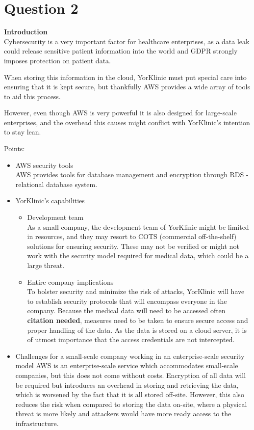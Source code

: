 \documentclass[11pt]{article} \usepackage{biblatex} 
\begin{document}
 \section*{Question 2} \textbf{Introduction}\\ Cybersecurity is
a very important factor for healthcare enterprises, as a data leak could
release sensitive patient information into the world and GDPR strongly imposes
protection on patient data.

When storing this information in the cloud, YorKlinic must put special care
into ensuring that it is kept secure, but thankfully AWS provides a wide array
of tools to aid this process.

However, even though AWS is very powerful it is also designed for large-scale
enterprises, and the overhead this causes might conflict with YorKlinic's
intention to stay lean.

Points: 
\begin{itemize} 
    \item AWS security tools \\ AWS provides tools for database management and encryption through RDS \-- relational database system. 

    \item YorKlinic's capabilities \begin{itemize}
        \item Development team \\ As a small company, the development team of YorKlinic might be limited in resources, and they may resort to COTS (commercial off-the-shelf) solutions for ensuring security. These may not be verified or might not work with the security model required for medical data, which could be a large threat. 

        \item Entire company implications \\ To bolster security and minimize the risk of attacks, YorKlinic will have to establish security protocols that will encompass everyone in the company. Because the medical data will need to be accessed often \textbf{citation needed}, measures need to be taken to ensure secure access and proper handling of the data. As the data is stored on a cloud server, it is of utmost importance that the access credentials are not intercepted. 

    \end{itemize} 

\item Challenges for a small-scale company working in an enterprise-scale security model AWS is an enterprise-scale service which accommodates small-scale companies, but this does not come without costs. Encryption of all data will be required but introduces an overhead in storing and retrieving the data, which is worsened by the fact that it is all stored off-site. However, this also reduces the risk when compared to storing the data on-site, where a physical threat is more likely and attackers would have more ready access to the infrastructure.

\end{itemize} 
\end{document}

